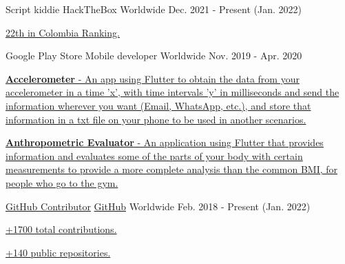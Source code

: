 
\begin{cventries}

  \cventry
    {Script kiddie} %
    {HackTheBox} %
    {Worldwide} %
    {Dec. 2021 - Present (Jan. 2022)} %
    {
      \begin{cvitems} %
        \item {\href{https://app.hackthebox.com/rankings/country/CO}{22th in Colombia Ranking.}}
      \end{cvitems}
    }

  \cventry
    {Google Play Store} %
    {Mobile developer} %
    {Worldwide} %
    {Nov. 2019 - Apr. 2020} %
    {
      \begin{cvitems} %
        \item {\href{https://play.google.com/store/apps/details?id=com.grisu.accelerometer}{
        \textbf{Accelerometer} - An app using Flutter to obtain the data from your accelerometer
        in a time 'x', with time intervals 'y' in milliseconds and send the information wherever you
        want (Email, WhatsApp, etc.), and store that information in a txt file on your phone to be
        used in another scenarios.}}
        \item {\href{https://play.google.com/store/apps/details?id=com.grisu.anthropometric_evaluator}{
          \textbf{Anthropometric Evaluator} - An application using Flutter that provides information
          and evaluates some of the parts of your body with certain measurements to provide a more
          complete analysis than the common BMI, for people who go to the gym.}}
      \end{cvitems}
    }

  \cventry
    {\href{https://github.com/Youngermaster}{GitHub Contributor}} %
    {\href{https://github.com/Youngermaster}{GitHub}} %
    {Worldwide} %
    {Feb. 2018 - Present (Jan. 2022)} %
    {
      \begin{cvitems} %
        \item {\href{https://github.com/Youngermaster}{+1700 total contributions.}}
        \item {\href{https://github.com/Youngermaster}{+140 public repositories.}}
      \end{cvitems}
    }

\end{cventries}
